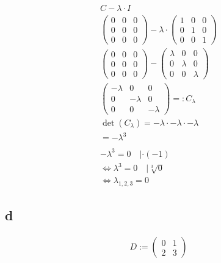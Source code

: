 \begin{align*}
    C - \lambda \cdot I \\
    \begin{pmatrix}
        0 & 0 & 0 \\
        0 & 0 & 0 \\
        0 & 0 & 0
    \end{pmatrix} - \lambda \cdot \begin{pmatrix}
        1 & 0 & 0 \\
        0 & 1 & 0 \\
        0 & 0 & 1
    \end{pmatrix} \\
    \begin{pmatrix}
        0 & 0 & 0 \\
        0 & 0 & 0 \\
        0 & 0 & 0
    \end{pmatrix} - \begin{pmatrix}
        \lambda & 0 & 0 \\
        0 & \lambda & 0 \\
        0 & 0 & \lambda
    \end{pmatrix} \\
    \begin{pmatrix}
        -\lambda & 0 & 0 \\
        0 & -\lambda & 0 \\
        0 & 0 & -\lambda
    \end{pmatrix} =: C_\lambda \\
    \det(C_\lambda) = -\lambda \cdot -\lambda \cdot -\lambda \\
    = -\lambda^3 \\\\
    -\lambda^3 = 0 \quad |\cdot (-1) \\
    \Leftrightarrow \lambda^3 = 0 \quad | \sqrt[3]{0} \\
    \Leftrightarrow \lambda_{1, 2, 3} = 0
\end{align*}

\subsection{d}

\begin{align*}
    D := \begin{pmatrix}
        0 & 1 \\
        2 & 3
    \end{pmatrix}
\end{align*}

